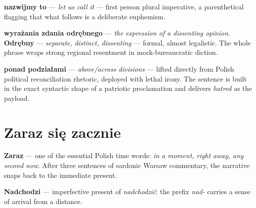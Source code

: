 
\textbf{nazwijmy to} --- \textit{let us call it} --- first person plural imperative, 
a parenthetical flagging that what follows is a deliberate euphemism.

\textbf{wyrażania zdania odrębnego} --- \textit{the expression of a dissenting opinion}. 
\textbf{Odrębny} --- \textit{separate, distinct, dissenting} --- formal, almost 
legalistic. The whole phrase wraps strong regional resentment in mock-bureaucratic diction.



\textbf{ponad podziałami} --- \textit{above/across divisions} --- lifted 
directly from Polish political reconciliation rhetoric, deployed with lethal 
irony. The sentence is built in the exact syntactic shape of a patriotic 
proclamation and delivers \textit{hatred} as the payload.

\section{Zaraz się zacznie}


\textbf{Zaraz} --- one of the essential Polish time words: \textit{in a moment, 
right away, any second now}. After three sentences of sardonic Warsaw commentary, 
the narrative snaps back to the immediate present.

\textbf{Nadchodzi} --- imperfective present of \textit{nadchodzić}: the prefix 
\textit{nad-} carries a sense of arrival from a distance.




